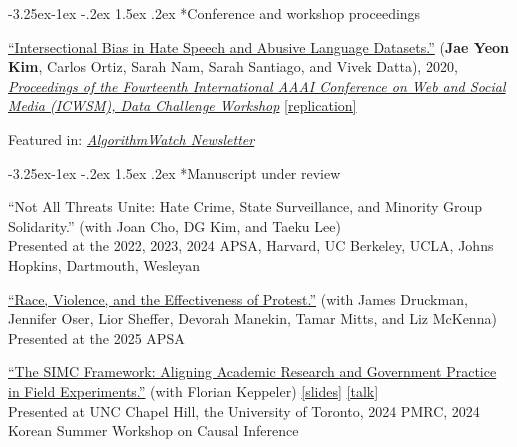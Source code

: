 \documentclass[10pt, letterpaper]{article}
\makeatletter
\renewcommand\subsection{\@startsection{subsection}{2}{\z@}%
  {-3.25ex\@plus -1ex \@minus -.2ex}%
  {1.5ex \@plus .2ex}%
  {\normalfont\large\bfseries\color{cvnavy}}}
\renewenvironment{itemize}{
\begin{list}{}{
        \setlength{\leftmargin}{1.5em}
        \setlength{\itemsep}{0.10em}
        \setlength{\parskip}{0pt}
        \setlength{\parsep}{0.10em}
    }
}{
\end{list}
}
\makeatother
\begin{document}
\subsection*{Conference and workshop proceedings}
\begin{etaremune}
\item \href{https://arxiv.org/abs/2005.05921}{``Intersectional Bias in Hate Speech and Abusive Language Datasets.''} (\textbf{Jae Yeon Kim}, Carlos Ortiz, Sarah Nam, Sarah Santiago, and Vivek Datta), 2020, \href{https://sites.google.com/view/icwsm2020datachallenge/home}{\textit{Proceedings of the Fourteenth International AAAI Conference on Web and Social Media (ICWSM), Data Challenge Workshop}} \href{https://github.com/jaeyk/intersectional-bias-in-ml}{[replication]}

\begin{itemize}
    \item Featured in: \textit{\href{http://x3ysn.mjt.lu/nl2/x3ysn/xs09.html?hl=en}{AlgorithmWatch Newsletter} }
\end{itemize}
\end{etaremune}

\subsection*{Manuscript under review}

\begin{etaremune}

\item ``Not All Threats Unite: Hate Crime, State Surveillance, and Minority Group Solidarity.'' (with Joan Cho, DG Kim, and Taeku Lee) 
\\ Presented at the 2022, 2023, 2024 APSA, Harvard, UC Berkeley, UCLA, Johns Hopkins, Dartmouth, Wesleyan

\item \href{https://papers.ssrn.com/sol3/papers.cfm?abstract_id=5696242}{``Race, Violence, and the Effectiveness of Protest.''} (with James Druckman, Jennifer Oser,  Lior Sheffer, Devorah Manekin, Tamar Mitts, and Liz McKenna) 
\\ Presented at the 2025 APSA

\item \href{https://doi.org/10.31235/osf.io/wzva9_v1}{``The SIMC Framework: Aligning Academic Research and Government Practice in Field Experiments.''} (with Florian Keppeler) 
\href{https://github.com/jaeyk/jaeyk.github.io/blob/main/slides/CIRL SIMC Kim 2026.pdf}{[slides]} \href{https://unc.zoom.us/rec/share/KSgNwGTNlpDp-d0dNj_yn3uoFAYUFIpv75IGXtmiVzOOy3Zt3de34aHb7Nni5MPF.IQOzB6qJBADmEBen?startTime=1790957318000}{[talk]} 
\\ Presented at UNC Chapel Hill, the University of Toronto, 2024 PMRC, 2024 Korean Summer Workshop on Causal Inference


\end{etaremune}
\end{document}
